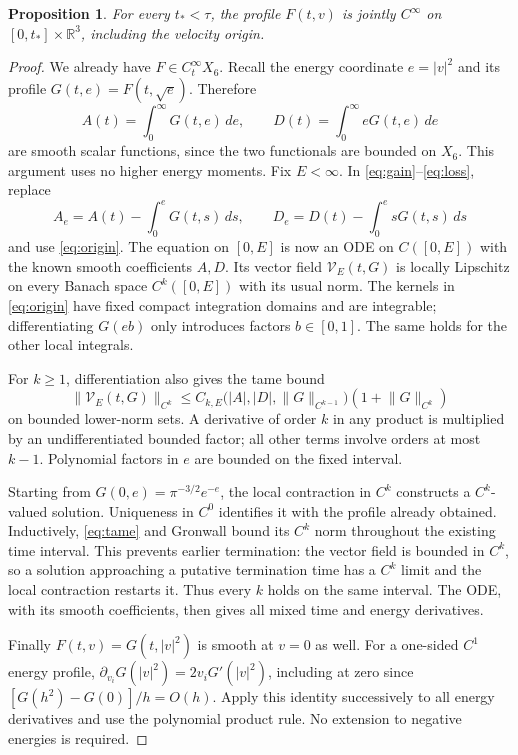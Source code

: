\documentclass[11pt,a4paper]{article}
\numberwithin{equation}{section}
\newtheorem{proposition}[theorem]{Proposition}
\theoremstyle{remark}
\newcommand{\R}{\mathbb R}
\newcommand{\dd}{\,d}
\newcommand{\norm}[2]{\lVert #1\rVert_{#2}}
\begin{document}
\begin{proposition}\label{prop:smooth}
For every \(t_*<\tau\), the profile \(F(t,v)\) is jointly
\(C^\infty\) on \([0,t_*]\times\R^3\), including the velocity origin.
\end{proposition}
\begin{proof}
We already have \(F\in C^\infty_tX_6\). Recall the energy coordinate
\(e=|v|^2\) and its profile \(G(t,e)=F(t,\sqrt e)\). Therefore
\[
 A(t)=\int_0^\infty G(t,e)\dd e,\qquad
 D(t)=\int_0^\infty eG(t,e)\dd e
\]
are smooth scalar functions, since the two functionals are bounded on
\(X_6\). This argument uses no higher energy moments.
Fix \(E<\infty\). In \eqref{eq:gain}--\eqref{eq:loss}, replace
\[
 A_e=A(t)-\int_0^eG(t,s)\dd s,\qquad
 D_e=D(t)-\int_0^e sG(t,s)\dd s
\]
and use \eqref{eq:origin}. The equation on \([0,E]\) is now an ODE
on \(C([0,E])\) with the known smooth coefficients \(A,D\).
Its vector field \(\mathcal V_E(t,G)\) is locally Lipschitz on every
Banach space \(C^k([0,E])\) with its usual norm.
The kernels in \eqref{eq:origin} have fixed compact integration domains
and are integrable; differentiating \(G(eb)\) only introduces factors
\(b\in[0,1]\). The same holds for the other local integrals.

For \(k\geq1\), differentiation also gives the tame bound
\begin{equation}\label{eq:tame}
 \norm{\mathcal V_E(t,G)}{C^k}
 \leq C_{k,E}\bigl(|A|,|D|,\norm{G}{C^{k-1}}\bigr)
                     (1+\norm{G}{C^k})
\end{equation}
on bounded lower-norm sets. A derivative of order \(k\) in any product
is multiplied by an undifferentiated bounded factor; all other terms
involve orders at most \(k-1\). Polynomial factors in \(e\) are bounded
on the fixed interval.

Starting from \(G(0,e)=\pi^{-3/2}e^{-e}\), the local contraction in
\(C^k\) constructs a \(C^k\)-valued solution. Uniqueness in \(C^0\)
identifies it with the profile already obtained. Inductively,
\eqref{eq:tame} and Gronwall bound its \(C^k\) norm throughout the
existing time interval. This prevents earlier termination: the vector
field is bounded in \(C^k\), so a solution approaching a putative
termination time has a \(C^k\) limit and the local contraction restarts
it. Thus every \(k\) holds on the same interval.
The ODE, with its smooth coefficients, then gives all mixed time and
energy derivatives.

Finally \(F(t,v)=G(t,|v|^2)\) is smooth at \(v=0\) as well.
For a one-sided \(C^1\) energy profile,
\(\partial_{v_i}G(|v|^2)=2v_iG'(|v|^2)\), including at zero since
\([G(h^2)-G(0)]/h=O(h)\). Apply this identity successively to all energy
derivatives and use the polynomial product rule. No extension to
negative energies is required.
\end{proof}
\end{document}
